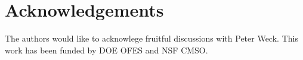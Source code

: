 \documentclass[aps,prl,amsmath,amssymb,reprint,superscriptaddress]{revtex4-1} %
\begin{document}



\section*{Acknowledgements}
The authors would like to acknowlege fruitful discussions with Peter Weck. This work has been funded by DOE OFES and NSF CMSO.
\end{document}

